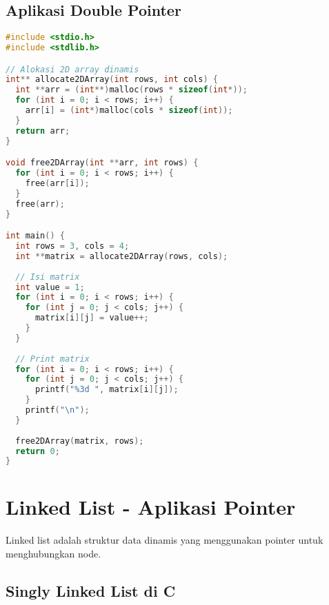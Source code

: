 \documentclass[../main.tex]{subfiles}
\begin{document}
\subsection{Aplikasi Double Pointer}

\begin{lstlisting}[language=C, caption={Double pointer untuk 2D array}]
#include <stdio.h>
#include <stdlib.h>

// Alokasi 2D array dinamis
int** allocate2DArray(int rows, int cols) {
  int **arr = (int**)malloc(rows * sizeof(int*));
  for (int i = 0; i < rows; i++) {
    arr[i] = (int*)malloc(cols * sizeof(int));
  }
  return arr;
}

void free2DArray(int **arr, int rows) {
  for (int i = 0; i < rows; i++) {
    free(arr[i]);
  }
  free(arr);
}

int main() {
  int rows = 3, cols = 4;
  int **matrix = allocate2DArray(rows, cols);
  
  // Isi matrix
  int value = 1;
  for (int i = 0; i < rows; i++) {
    for (int j = 0; j < cols; j++) {
      matrix[i][j] = value++;
    }
  }
  
  // Print matrix
  for (int i = 0; i < rows; i++) {
    for (int j = 0; j < cols; j++) {
      printf("%3d ", matrix[i][j]);
    }
    printf("\n");
  }
  
  free2DArray(matrix, rows);
  return 0;
}
\end{lstlisting}

\section{Linked List - Aplikasi Pointer}

Linked list adalah struktur data dinamis yang menggunakan pointer untuk menghubungkan node.

\subsection{Singly Linked List di C}
\end{document}
